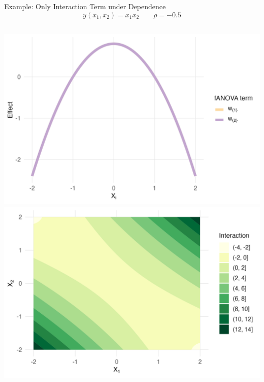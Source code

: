 \begin{frame}{Example: Only Interaction Term under Dependence}
  \[
  y(x_1, x_2) = x_1 x_2 \qquad \rho = -0.5
  \]
    \begin{columns}
      \includegraphics[width=\linewidth]{../images/experiment_section/interaction_a1p00_a2p00_a11p00_a22p00_a12p20_rhom05_main.png}
      \includegraphics[width=\linewidth]{../images/experiment_section/interaction_a1p00_a2p00_a11p00_a22p00_a12p20_rhom05_interaction.png}
  \end{columns}
  
\end{frame}

